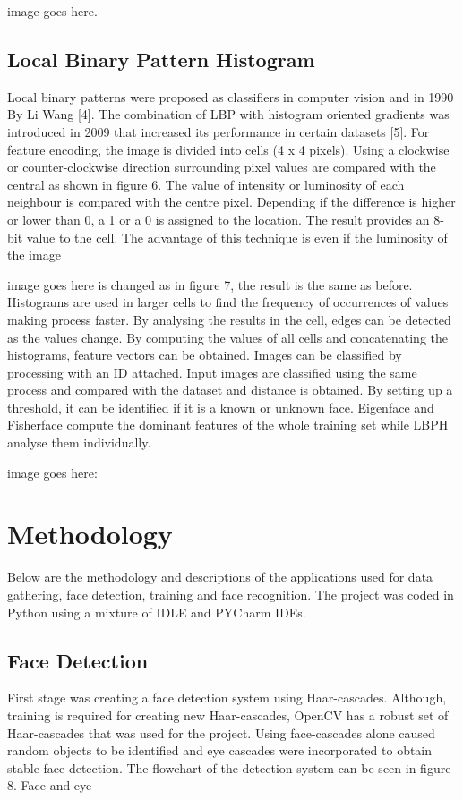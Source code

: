 \documentclass[11pt]{article}
\begin{document}
image goes here.
\subsection{Local Binary Pattern Histogram}
Local binary patterns were proposed as classifiers in computer vision and in 1990 By Li Wang [4].
The combination of LBP with histogram oriented gradients was introduced in 2009 that increased its
performance in certain datasets [5]. For feature encoding, the image is divided into cells (4 x 4 pixels).
Using a clockwise or counter-clockwise direction surrounding pixel values are compared with the central
as shown in figure 6. The value of intensity or luminosity of each neighbour is compared with the centre
pixel. Depending if the difference is higher or lower than 0, a 1 or a 0 is assigned to the location. The result
provides an 8-bit value to the cell. The advantage of this technique is even if the luminosity of the image

image goes here
is changed as in figure 7, the result is the same as before. Histograms are used in larger cells to find the
frequency of occurrences of values making process faster. By analysing the results in the cell, edges can
be detected as the values change. By computing the values of all cells and concatenating the histograms,
feature vectors can be obtained. Images can be classified by processing with an ID attached. Input
images are classified using the same process and compared with the dataset and distance is obtained. By
setting up a threshold, it can be identified if it is a known or unknown face. Eigenface and Fisherface
compute the dominant features of the whole training set while LBPH analyse them individually.

image goes here:
\section{Methodology}
Below are the methodology and descriptions of the applications used for data gathering, face detection,
training and face recognition. The project was coded in Python using a mixture of IDLE and PYCharm
IDEs.
\subsection{Face Detection}
First stage was creating a face detection system using Haar-cascades. Although, training is required for
creating new Haar-cascades, OpenCV has a robust set of Haar-cascades that was used for the project.
Using face-cascades alone caused random objects to be identified and eye cascades were incorporated to
obtain stable face detection. The flowchart of the detection system can be seen in figure 8. Face and eye
\end{document}
